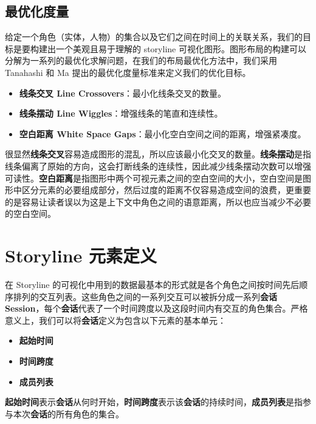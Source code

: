 \subsection{最优化度量}
\label{metrics}
给定一个角色（实体，人物）的集合以及它们之间在时间上的关联关系，我们的目标是要构建出一个美观且易于理解的 storyline 可视化图形。图形布局的构建可以分解为一系列的最优化求解问题，在我们的布局最优化方法中，我们采用 Tanahashi 和 Ma \cite{tanahashi2012design} 提出的最优化度量标准来定义我们的优化目标。
\begin{itemize}
\item \textbf{线条交叉 Line Crossovers}：最小化线条交叉的数量。
\item \textbf{线条摆动 Line Wiggles}：增强线条的笔直和连续性。
\item \textbf{空白距离 White Space Gaps}：最小化空白空间之间的距离，增强紧凑度。
\end{itemize}
很显然\textbf{线条交叉}容易造成图形的混乱，所以应该最小化交叉的数量。\textbf{线条摆动}是指线条偏离了原始的方向，这会打断线条的连续性，因此减少线条摆动次数可以增强可读性。\textbf{空白距离}是指图形中两个可视元素之间的空白空间的大小，空白空间是图形中区分元素的必要组成部分，然后过度的距离不仅容易造成空间的浪费，更重要的是容易让读者误以为这是上下文中角色之间的语意距离，所以也应当减少不必要的空白空间。

\section{Storyline 元素定义}
在 Storyline 的可视化中用到的数据最基本的形式就是各个角色之间按时间先后顺序排列的交互列表。这些角色之间的一系列交互可以被拆分成一系列\textbf{会话 Session}，每个\textbf{会话}代表了一个时间跨度以及这段时间内有交互的角色集合。严格意义上，我们可以将\textbf{会话}定义为包含以下元素的基本单元：
\begin{itemize}
\item \textbf{起始时间}
\item \textbf{时间跨度}
\item \textbf{成员列表}
\end{itemize}
\textbf{起始时间}表示\textbf{会话}从何时开始，\textbf{时间跨度}表示该\textbf{会话}的持续时间，\textbf{成员列表}是指参与本次\textbf{会话}的所有角色的集合。
